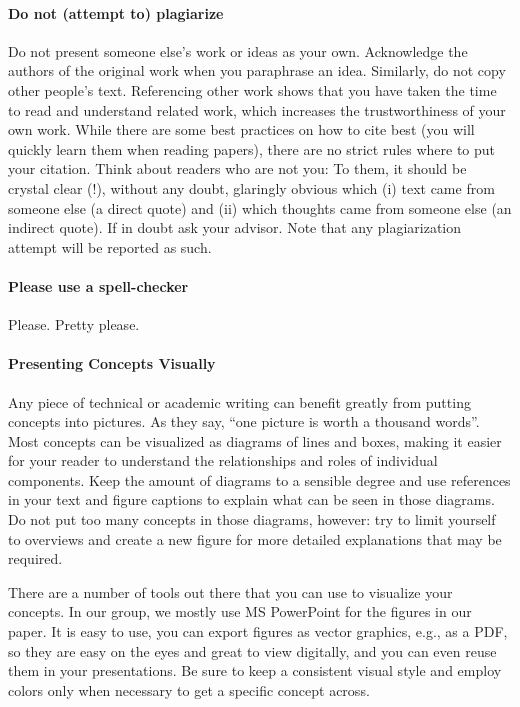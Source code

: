 \documentclass[a4paper]{article}
\begin{document}
\paragraph{Do not (attempt to) plagiarize}
\label{subsec:plags}
Do not present someone else's work or ideas as your own.
Acknowledge the authors of the original work when you paraphrase an idea.
Similarly, do not copy other people's text.
Referencing other work shows that you have taken the time to read and understand related work, which increases the trustworthiness of your own work.
While there are some best practices on how to cite best (you will quickly learn them when reading papers), there are no strict rules where to put your citation.
Think about readers who are not you: To them, it should be crystal clear (!), without any doubt, glaringly obvious which (i) text came from someone else (a direct quote) and (ii) which thoughts came from someone else (an indirect quote).
If in doubt ask your advisor.
Note that any plagiarization attempt will be reported as such.

\paragraph{Please use a spell-checker}
Please.
Pretty please.

\paragraph{Presenting Concepts Visually} \label{sec:diagrams}

Any piece of technical or academic writing can benefit greatly from putting concepts into pictures.
As they say, ``one picture is worth a thousand words''.
Most concepts can be visualized as diagrams of lines and boxes, making it easier for your reader to understand the relationships and roles of individual components.
Keep the amount of diagrams to a sensible degree and use references in your text and figure captions to explain what can be seen in those diagrams.
Do not put too many concepts in those diagrams, however: try to limit yourself to overviews and create a new figure for more detailed explanations that may be required.

There are a number of tools out there that you can use to visualize your concepts.
In our group, we mostly use MS PowerPoint for the figures in our paper.
It is easy to use, you can export figures as vector graphics, e.g., as a PDF, so they are easy on the eyes and great to view digitally, and you can even reuse them in your presentations.
Be sure to keep a consistent visual style and employ colors only when necessary to get a specific concept across.
\end{document}
